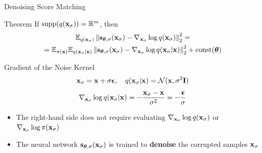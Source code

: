 \documentclass{beamer}
\begin{document}
\begin{frame}{Denoising Score Matching}
	\begin{block}{Theorem}
		If $\text{supp}(q(\mathbf{x}_{\sigma})) = \mathbb{R}^m$, then
		\begin{multline*}
			\mathbb{E}_{q(\mathbf{x}_{\sigma})}\left\| \mathbf{s}_{\boldsymbol{\theta}, \sigma}(\mathbf{x}_{\sigma}) - \nabla_{\mathbf{x}_{\sigma}} \log q(\mathbf{x}_{\sigma}) \right\|_2^2 = \\
			= \mathbb{E}_{\pi(\mathbf{x})} \mathbb{E}_{q(\mathbf{x}_{\sigma} | \mathbf{x})}\left\| \mathbf{s}_{\boldsymbol{\theta}, \sigma}(\mathbf{x}_{\sigma}) - \nabla_{\mathbf{x}_{\sigma}} \log q(\mathbf{x}_{\sigma} | \mathbf{x}) \right\|_2^2 + \text{const}(\boldsymbol{\theta})
		\end{multline*}
		\vspace{-0.5cm}
	\end{block}
    \eqpause
	\begin{block}{Gradient of the Noise Kernel}
		\vspace{-0.3cm}
		\[
			\mathbf{x}_{\sigma} = \mathbf{x} + \sigma \boldsymbol{\epsilon}, \quad q(\mathbf{x}_{\sigma} | \mathbf{x}) = \mathcal{N}(\mathbf{x}, \sigma^2 \mathbf{I})
		\]
		\vspace{-0.3cm}
		\[
			\nabla_{\mathbf{x}_{\sigma}} \log q(\mathbf{x}_{\sigma} | \mathbf{x}) = - \frac{\mathbf{x}_{\sigma} - \mathbf{x}}{\sigma^2}  = - \frac{\boldsymbol{\epsilon}}{\sigma}
		\]
		\vspace{-0.5cm}
	\end{block}
    \eqpause
	\begin{itemize}
		\item The right-hand side does not require evaluating $\nabla_{\mathbf{x}_{\sigma}} \log q(\mathbf{x}_{\sigma})$ or $\nabla_{\mathbf{x}_{\sigma}} \log \pi(\mathbf{x}_{\sigma})$
		\item The neural network $\mathbf{s}_{\boldsymbol{\theta}, \sigma}(\mathbf{x}_{\sigma})$ is trained to \textbf{denoise} the corrupted samples $\mathbf{x}_{\sigma}$
	\end{itemize}
\end{frame}
\end{document}
